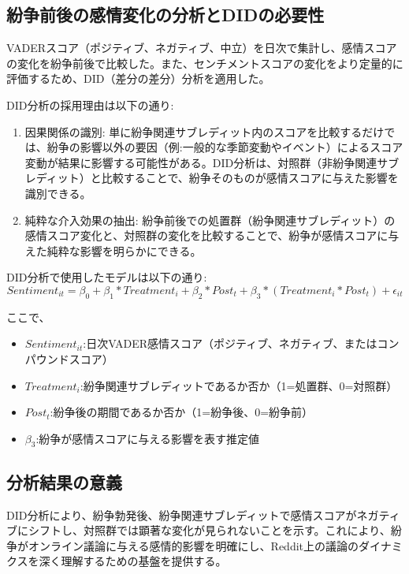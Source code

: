 \documentclass[11pt, a4j]{jreport}
\begin{document}
    \subsection*{紛争前後の感情変化の分析とDIDの必要性}
    VADERスコア（ポジティブ、ネガティブ、中立）を日次で集計し、感情スコアの変化を紛争前後で比較した。また、センチメントスコアの変化をより定量的に評価するため、DID（差分の差分）分析を適用した。

    DID分析の採用理由は以下の通り:
    \begin{enumerate}
        \item 因果関係の識別:
            単に紛争関連サブレディット内のスコアを比較するだけでは、紛争の影響以外の要因（例:一般的な季節変動やイベント）によるスコア変動が結果に影響する可能性がある。DID分析は、対照群（非紛争関連サブレディット）と比較することで、紛争そのものが感情スコアに与えた影響を識別できる。
        \item 純粋な介入効果の抽出:
            紛争前後での処置群（紛争関連サブレディット）の感情スコア変化と、対照群の変化を比較することで、紛争が感情スコアに与えた純粋な影響を明らかにできる。
    \end{enumerate}

    DID分析で使用したモデルは以下の通り:
    \begin{equation}
        Sentiment_{it} = \beta_{0} + \beta_{1}*Treatment_{i} + \beta_{2}*Post_{t} + \beta_{3}*(Treatment_{i} * Post_{t}) + \epsilon_{it}
    \end{equation}

    ここで、
    \begin{itemize}
        \item $Sentiment_{it}$:日次VADER感情スコア（ポジティブ、ネガティブ、またはコンパウンドスコア）
        \item $Treatment_{i}$:紛争関連サブレディットであるか否か（1=処置群、0=対照群）
        \item $Post_{t}$:紛争後の期間であるか否か（1=紛争後、0=紛争前）
        \item $\beta_{3}$:紛争が感情スコアに与える影響を表す推定値
    \end{itemize}

    \subsection*{分析結果の意義}
    DID分析により、紛争勃発後、紛争関連サブレディットで感情スコアがネガティブにシフトし、対照群では顕著な変化が見られないことを示す。これにより、紛争がオンライン議論に与える感情的影響を明確にし、Reddit上の議論のダイナミクスを深く理解するための基盤を提供する。
\end{document}
